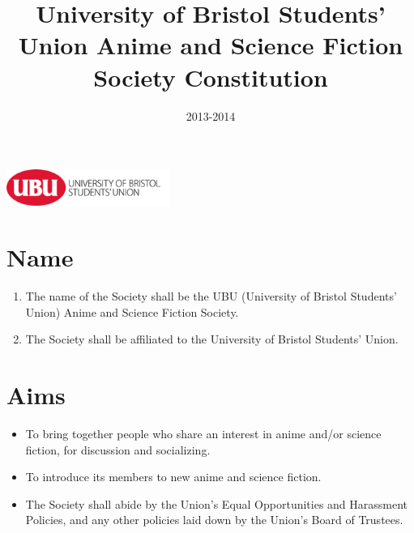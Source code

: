 \documentclass[a4paper,10pt]{article}
\title{University of Bristol Students' Union Anime and Science Fiction Society Constitution}
\author{}
\date{2013-2014}
\begin{document}
\begin{titlepage}
\clearpage\maketitle
\thispagestyle{empty}
\vfill
\includegraphics[height=1.2cm,keepaspectratio=true]{./images/ubu-logo.png}
\end{titlepage}

\section{Name}
\begin{enumerate}
  \item The name of the Society shall be the UBU (University of Bristol Students' Union) Anime and Science Fiction Society.
  \item The Society shall be affiliated to the University of Bristol Students' Union.
\end{enumerate}

\section{Aims}
\begin{itemize}
  \item To bring together people who share an interest in anime and/or science fiction, for discussion and socializing.
  \item To introduce its members to new anime and science fiction.
  \item The Society shall abide by the Union's Equal Opportunities and Harassment Policies, and any other policies laid down by the Union's Board of Trustees.
\end{itemize}
\end{document}
